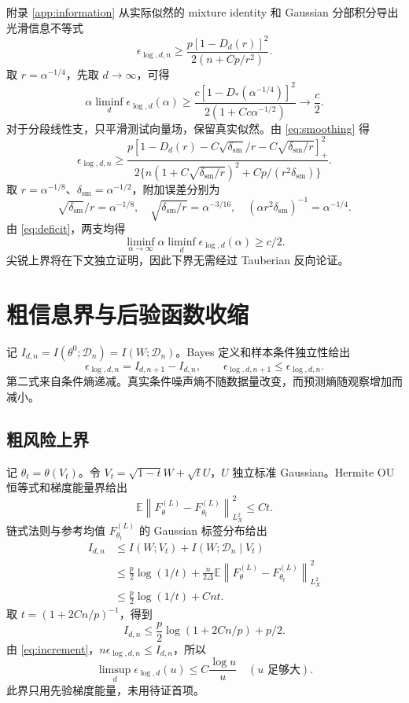 \documentclass[a4paper]{tufte-handout}
\newcommand{\E}{\mathbb E}
\newcommand{\dsm}{\delta_{\mathrm{sm}}}
\newcommand{\norm}[1]{\left\|#1\right\|}
\begin{document}
\begin{fullwidth}
附录 \ref{app:information} 从实际似然的 mixture identity 和 Gaussian 分部积分导出光滑信息不等式
\begin{equation}\label{eq:lower-smooth}
\epsilon_{\log,d,n}\ge\frac{p[1-D_d(r)]^2}{2(n+Cp/r^2)}.
\end{equation}
取 $r=\alpha^{-1/4}$，先取 $d\to\infty$，可得
\[
\alpha\liminf_d\epsilon_{\log,d}(\alpha)
\ge\frac{c[1-D_*(\alpha^{-1/4})]^2}
{2(1+Cc\alpha^{-1/2})}\longrightarrow\frac c2.
\]
对于分段线性支，只平滑测试向量场，保留真实似然。由 \eqref{eq:smoothing} 得
\begin{equation}\label{eq:lower-pl}
\epsilon_{\log,d,n}\ge
\frac{p[1-D_d(r)-C\sqrt{\dsm}/r-C\sqrt{\dsm/r}]_+^2}
{2\{n(1+C\sqrt{\dsm/r})^2+Cp/(r^2\dsm)\}}.
\end{equation}
取 $r=\alpha^{-1/8}$、$\dsm=\alpha^{-1/2}$，附加误差分别为
\[
\sqrt{\dsm}/r=\alpha^{-1/8},\quad
\sqrt{\dsm/r}=\alpha^{-3/16},\quad
(\alpha r^2\dsm)^{-1}=\alpha^{-1/4}.
\]
由 \eqref{eq:deficit}，两支均得
\begin{equation}\label{eq:lower-final}
\liminf_{\alpha\to\infty}\alpha\liminf_d\epsilon_{\log,d}(\alpha)\ge c/2.
\end{equation}
尖锐上界将在下文独立证明，因此下界无需经过 Tauberian 反向论证。

\section{粗信息界与后验函数收缩}
记 $I_{d,n}=I(\theta^0;\mathcal D_n)=I(W;\mathcal D_n)$。Bayes 定义和样本条件独立性给出
\begin{equation}\label{eq:increment}
\epsilon_{\log,d,n}=I_{d,n+1}-I_{d,n},\qquad
\epsilon_{\log,d,n+1}\le \epsilon_{\log,d,n}.
\end{equation}
第二式来自条件熵递减。真实条件噪声熵不随数据量改变，而预测熵随观察增加而减小。

\subsection{粗风险上界}
记 $\theta_t=\theta(V_t)$。令 $V_t=\sqrt{1-t}W+\sqrt tU$，$U$ 独立标准 Gaussian。Hermite OU 恒等式和梯度能量界给出
\[
\E\norm{F_\theta^{(L)}-F_{\theta_t}^{(L)}}_{L_X^2}^2\le Ct.
\]
链式法则与参考均值 $F_{\theta_t}^{(L)}$ 的 Gaussian 标签分布给出
\begin{equation}\begin{aligned}
I_{d,n}&\le I(W;V_t)+I(W;\mathcal D_n\mid V_t)\\
&\le\frac p2\log(1/t)+\frac n{2\Delta}
\E\norm{F_\theta^{(L)}-F_{\theta_t}^{(L)}}_{L_X^2}^2\\
&\le\frac p2\log(1/t)+Cnt.
\end{aligned}\end{equation}
取 $t=(1+2Cn/p)^{-1}$，得到
\[
I_{d,n}\le\frac p2\log(1+2Cn/p)+p/2.
\]
由 \eqref{eq:increment}，$n\epsilon_{\log,d,n}\le I_{d,n}$，所以
\begin{equation}\label{eq:coarse}
\limsup_d \epsilon_{\log,d}(u)\le C\frac{\log u}{u}
\quad(u\text{ 足够大}).
\end{equation}
此界只用先验梯度能量，未用待证首项。


\end{fullwidth}
\end{document}
